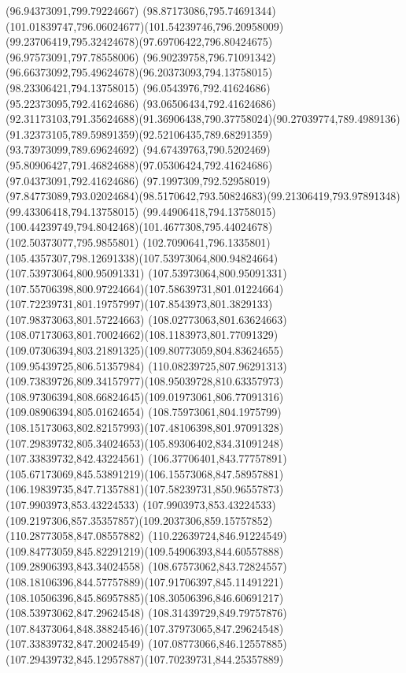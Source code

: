 {{\lineto(96.94373091,799.79224667)
\curveto(98.87173086,795.74691344)(101.01839747,796.06024677)(101.54239746,796.20958009)
\curveto(99.23706419,795.32424678)(97.69706422,796.80424675)(96.97573091,797.78558006)
\curveto(96.90239758,796.71091342)(96.66373092,795.49624678)(96.20373093,794.13758015)
\lineto(98.23306421,794.13758015)
\lineto(96.0543976,792.41624686)
\lineto(95.22373095,792.41624686)
\lineto(93.06506434,792.41624686)
\curveto(92.31173103,791.35624688)(91.36906438,790.37758024)(90.27039774,789.4989136)
\curveto(91.32373105,789.59891359)(92.52106435,789.68291359)(93.73973099,789.69624692)
\curveto(94.67439763,790.5202469)(95.80906427,791.46824688)(97.05306424,792.41624686)
\lineto(97.04373091,792.41624686)
\lineto(97.1997309,792.52958019)
\curveto(97.84773089,793.02024684)(98.5170642,793.50824683)(99.21306419,793.97891348)
\lineto(99.43306418,794.13758015)
\lineto(99.44906418,794.13758015)
\curveto(100.44239749,794.8042468)(101.4677308,795.44024678)(102.50373077,795.9855801)
\curveto(102.7090641,796.1335801)(105.4357307,798.12691338)(107.53973064,800.94824664)
\lineto(107.53973064,800.95091331)
\curveto(107.53973064,800.95091331)(107.55706398,800.97224664)(107.58639731,801.01224664)
\curveto(107.72239731,801.19757997)(107.8543973,801.3829133)(107.98373063,801.57224663)
\curveto(108.02773063,801.63624663)(108.07173063,801.70024662)(108.1183973,801.77091329)
\curveto(109.07306394,803.21891325)(109.80773059,804.83624655)(109.95439725,806.51357984)
\curveto(110.08239725,807.96291313)(109.73839726,809.34157977)(108.95039728,810.63357973)
\curveto(108.97306394,808.66824645)(109.01973061,806.77091316)(109.08906394,805.01624654)
\curveto(108.75973061,804.1975799)(108.15173063,802.82157993)(107.48106398,801.97091328)
\curveto(107.29839732,805.34024653)(105.89306402,834.31091248)(107.33839732,842.43224561)
\curveto(106.37706401,843.77757891)(105.67173069,845.53891219)(106.15573068,847.58957881)
\curveto(106.19839735,847.71357881)(107.58239731,850.96557873)(107.9903973,853.43224533)
\curveto(107.9903973,853.43224533)(109.2197306,857.35357857)(109.2037306,859.15757852)
\lineto(110.28773058,847.08557882)
\lineto(110.22639724,846.91224549)
\curveto(109.84773059,845.82291219)(109.54906393,844.60557888)(109.28906393,843.34024558)
\curveto(108.67573062,843.72824557)(108.18106396,844.57757889)(107.91706397,845.11491221)
\curveto(108.10506396,845.86957885)(108.30506396,846.60691217)(108.53973062,847.29624548)
\lineto(108.31439729,849.79757876)
\curveto(107.84373064,848.38824546)(107.37973065,847.29624548)(107.33839732,847.20024549)
\curveto(107.08773066,846.12557885)(107.29439732,845.12957887)(107.70239731,844.25357889)
}}
